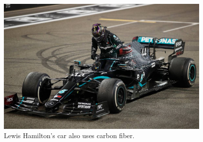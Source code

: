 \begin{figure}[htp]
\centering
\includegraphics[width=0.95\textwidth, angle=0]{Meetings/March/03-14-22/03-14-22 4.jpg}
\caption{Lewis Hamilton's car also uses carbon fiber.}
\label{fig:031022_4}
\end{figure}







